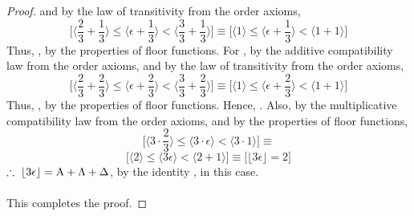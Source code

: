 \documentclass[preview]{standalone}
\begin{document}
\begin{proof}
    and by the law of transitivity from the order axioms,
    \begin{equation*}
        \bigg[
            \bigg \langle \frac{2}{3} + \frac{1}{3} \bigg \rangle
                \leq 
            \bigg \langle \epsilon + \frac{1}{3} \bigg \rangle 
                < 
            \bigg \langle \frac{3}{3} + \frac{1}{3} \bigg \rangle
        \bigg]
            \equiv
        \bigg[
            \bigg \langle 1 \bigg \rangle
                \leq 
            \bigg \langle \epsilon + \frac{1}{3} \bigg \rangle 
                < 
            \bigg \langle 1 + 1 \bigg \rangle
        \bigg]
    \end{equation*}
    Thus, , 
    by the properties of floor functions.
    For \bm{$\Delta$},
    by the additive compatibility law from the order axioms,
    and by the law of transitivity from the order axioms,
    \begin{equation*}
        \bigg[
            \bigg \langle \frac{2}{3} + \frac{2}{3} \bigg \rangle
                \leq 
            \bigg \langle \epsilon + \frac{2}{3} \bigg \rangle 
                < 
            \bigg \langle \frac{3}{3} + \frac{2}{3} \bigg \rangle
        \bigg]
            \equiv
        \bigg[
            \bigg \langle 1 \bigg \rangle
                \leq 
            \bigg \langle \epsilon + \frac{2}{3} \bigg \rangle 
                < 
            \bigg \langle 1 + 1 \bigg \rangle
        \bigg]
    \end{equation*}
    Thus, , 
    by the properties of floor functions.
    Hence, .
    Also, by the multiplicative compatibility law from the order axioms,
    and by the properties of floor functions,
    \begin{equation*}
        \bigg[
            \bigg \langle 3 \cdot \frac{2}{3} \bigg \rangle
                \leq
            \bigg \langle 3 \cdot \epsilon \bigg \rangle
                <
            \bigg \langle 3 \cdot 1 \bigg \rangle
        \bigg]
            \equiv
    \end{equation*}
    \begin{equation*}
        \bigg[
            \bigg \langle 2 \bigg \rangle
                \leq
            \bigg \langle 3 \epsilon \bigg \rangle
                <
            \bigg \langle 2 + 1 \bigg \rangle
        \bigg]
            \equiv
        \bigg[
            \big \lfloor 3 \epsilon \big \rfloor
                =
            2
        \bigg]
    \end{equation*}
    $\therefore \text{\space} \relax{
        \lfloor 3 \epsilon \rfloor
            =
        \mathrm{A} + \Lambda + \Delta
    }$, by the identity , in this case.
    \\ \\
    This completes the proof.
\color{lightgray} \end{proof}
\end{document}
